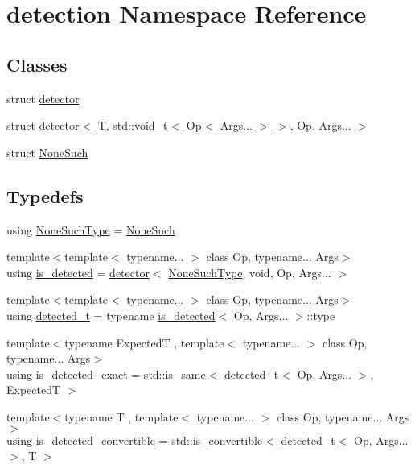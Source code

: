 \hypertarget{namespacedetection}{}\section{detection Namespace Reference}
\label{namespacedetection}
\subsection*{Classes}
\begin{DoxyCompactItemize}
\item 
struct \hyperlink{structdetection_1_1detector}{detector}
\item 
struct \hyperlink{structdetection_1_1detector_3_01_t_00_01std_1_1void__t_3_01_op_3_01_args_8_8_8_01_4_01_4_00_01_op_00_01_args_8_8_8_01_4}{detector$<$ T, std\+::void\+\_\+t$<$ Op$<$ Args... $>$ $>$, Op, Args... $>$}
\item 
struct \hyperlink{structdetection_1_1_none_such}{None\+Such}
\end{DoxyCompactItemize}
\subsection*{Typedefs}
\begin{DoxyCompactItemize}
\item 
using \hyperlink{namespacedetection_a08288d9ae2ffab86bb82bbdd27fbf77b}{None\+Such\+Type} = \hyperlink{structdetection_1_1_none_such}{None\+Such}
\item 
{\footnotesize template$<$template$<$ typename... $>$ class Op, typename... Args$>$ }\\using \hyperlink{namespacedetection_a30893549a3de1e9603d78dad6d5dce92}{is\+\_\+detected} = \hyperlink{structdetection_1_1detector}{detector}$<$ \hyperlink{namespacedetection_a08288d9ae2ffab86bb82bbdd27fbf77b}{None\+Such\+Type}, void, Op, Args... $>$
\item 
{\footnotesize template$<$template$<$ typename... $>$ class Op, typename... Args$>$ }\\using \hyperlink{namespacedetection_a25bd8500c8667f0015e88f9d26cca271}{detected\+\_\+t} = typename \hyperlink{namespacedetection_a30893549a3de1e9603d78dad6d5dce92}{is\+\_\+detected}$<$ Op, Args... $>$\+::type
\item 
{\footnotesize template$<$typename ExpectedT , template$<$ typename... $>$ class Op, typename... Args$>$ }\\using \hyperlink{namespacedetection_affc661f546e50448d9582e54280f7a11}{is\+\_\+detected\+\_\+exact} = std\+::is\+\_\+same$<$ \hyperlink{namespacedetection_a25bd8500c8667f0015e88f9d26cca271}{detected\+\_\+t}$<$ Op, Args... $>$, ExpectedT $>$
\item 
{\footnotesize template$<$typename T , template$<$ typename... $>$ class Op, typename... Args$>$ }\\using \hyperlink{namespacedetection_afb970b23e39cfecb33449d40242c49ff}{is\+\_\+detected\+\_\+convertible} = std\+::is\+\_\+convertible$<$ \hyperlink{namespacedetection_a25bd8500c8667f0015e88f9d26cca271}{detected\+\_\+t}$<$ Op, Args... $>$, T $>$
\end{DoxyCompactItemize}


